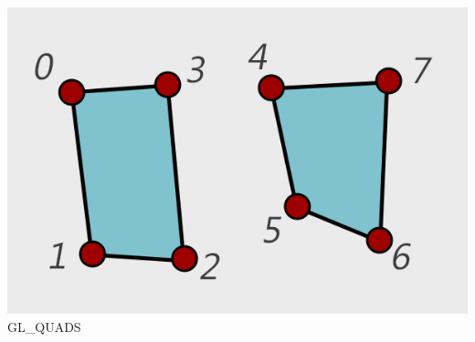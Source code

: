 \documentclass{beamer}
\begin{document}
\begin{frame}
\begin{columns}
	\begin{column}{0.3\textwidth}
		\centering		
		\includegraphics[width=\textwidth]{img/GL_QUADS}
		\\ { GL\_QUADS}
	\end{column}
\end{columns}
\end{frame}
\end{document}
